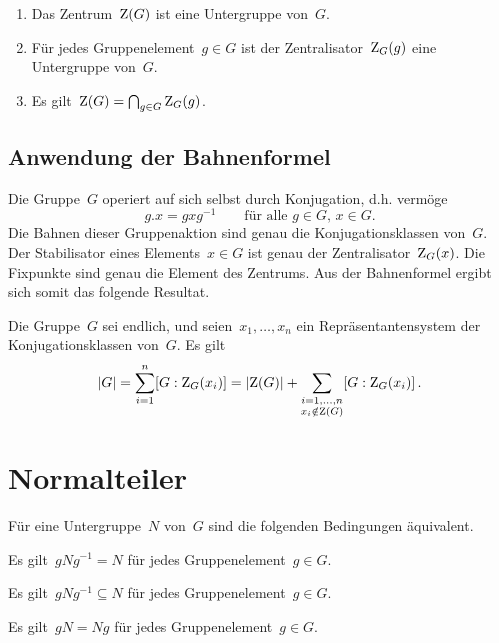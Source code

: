 \begin{proposition}
  \leavevmode
  \begin{enumerate}
    \item
      Das Zentrum~$\operatorname{Z}(G)$ ist eine Untergruppe von~$G$.
    \item
      Für jedes Gruppenelement~$g \in G$ ist der Zentralisator~$\operatorname{Z}_G(g)$ eine Untergruppe von~$G$.
    \item
      Es gilt~$\operatorname{Z}(G) = \bigcap_{g \in G} \operatorname{Z}_G(g)$.
  \end{enumerate}
\end{proposition}



\subsection{Anwendung der Bahnenformel}

Die Gruppe~$G$ operiert auf sich selbst durch Konjugation, d.h. vermöge
\[
  g.x = g x g^{-1}
  \qquad
  \text{für alle~$g \in G$,~$x \in G$.}
\]
Die Bahnen dieser Gruppenaktion sind genau die Konjugationsklassen von~$G$.
Der Stabilisator eines Elements~$x \in G$ ist genau der Zentralisator~$\operatorname{Z}_G(x)$.
Die Fixpunkte sind genau die Element des Zentrums.
Aus der Bahnenformel ergibt sich somit das folgende Resultat.

\begin{theorem}[Klassenformel]
  Die Gruppe~$G$ sei endlich, und seien~$x_1, \dotsc, x_n$ ein Repräsentantensystem der Konjugationsklassen von~$G$.
  Es gilt
  \[
    \lvert G\rvert
    =
    \sum_{i=1}^n [G : \operatorname{Z}_G(x_i)]
    =
    \lvert \operatorname{Z}(G) \rvert
    +
    \sum_{\substack{i = 1, \dotsc, n \\ x_i \notin \operatorname{Z}(G)}}
    [G : \operatorname{Z}_G(x_i)] \,.
  \]
\end{theorem}



\section{Normalteiler}

\begin{proposition}
  \label{characterizations of normal subgroups}
  Für eine Untergruppe~$N$ von~$G$ sind die folgenden Bedingungen äquivalent.
  \begin{equivlist}
    \item
      Es gilt~$g N g^{-1} = N$ für jedes Gruppenelement~$g \in G$.
    \item
      Es gilt~$g N g^{-1} \subseteq N$ für jedes Gruppenelement~$g \in G$.
    \item
      Es gilt~$gN = Ng$ für jedes Gruppenelement~$g \in G$.
  \end{equivlist}
\end{proposition}

